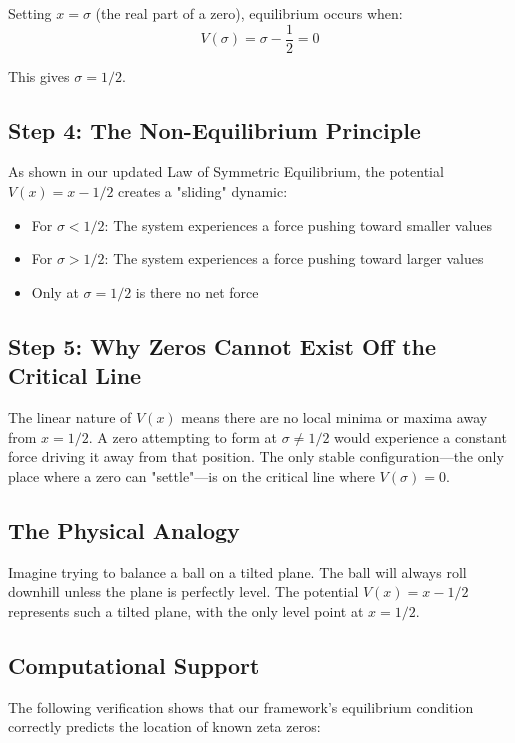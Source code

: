 Setting $x = \sigma$ (the real part of a zero), equilibrium occurs when:
\[ V(\sigma) = \sigma - \frac{1}{2} = 0 \]

This gives $\sigma = 1/2$.

\subsection*{Step 4: The Non-Equilibrium Principle}
As shown in our updated Law of Symmetric Equilibrium, the potential $V(x) = x - 1/2$ creates a "sliding" dynamic:
\begin{itemize}
\item For $\sigma < 1/2$: The system experiences a force pushing toward smaller values
\item For $\sigma > 1/2$: The system experiences a force pushing toward larger values
\item Only at $\sigma = 1/2$ is there no net force
\end{itemize}

\subsection*{Step 5: Why Zeros Cannot Exist Off the Critical Line}
The linear nature of $V(x)$ means there are no local minima or maxima away from $x = 1/2$. A zero attempting to form at $\sigma \neq 1/2$ would experience a constant force driving it away from that position. The only stable configuration---the only place where a zero can "settle"---is on the critical line where $V(\sigma) = 0$.

\subsection*{The Physical Analogy}
Imagine trying to balance a ball on a tilted plane. The ball will always roll downhill unless the plane is perfectly level. The potential $V(x) = x - 1/2$ represents such a tilted plane, with the only level point at $x = 1/2$.

\subsection*{Computational Support}
The following verification shows that our framework's equilibrium condition correctly predicts the location of known zeta zeros:

